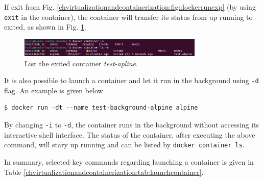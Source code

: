 If exit from Fig. \ref{chvirtualizationandcontainerization:fig:dockerrunexp} (by using \verb|exit| in the container), the container will transfer its status from up running to exited, as shown in Fig. \ref{chvirtualizationandcontainerization:fig:dockerrunexppart3}.
\begin{figure}
	\centering
	\includegraphics[width=250pt]{chapters/ch_virtualization_and_containerization/figures/dockerrunexppart3.png}
	\caption{List the exited container \textit{test-apline}.} \label{chvirtualizationandcontainerization:fig:dockerrunexppart3}
\end{figure}

It is also possible to launch a container and let it run in the background using \verb|-d| flag. An example is given below.
\begin{lstlisting}
$ docker run -dt --name test-background-alpine alpine
\end{lstlisting}
By changing \verb|-i| to \verb|-d|, the container runs in the background without accessing its interactive shell interface. The status of the container, after executing the above command, will stary up running and can be listed by \verb|docker container ls|.

In summary, selected key commands regarding launching a container is given in Table \ref{chvirtualizationandcontainerization:tab:launchcontainer}.

